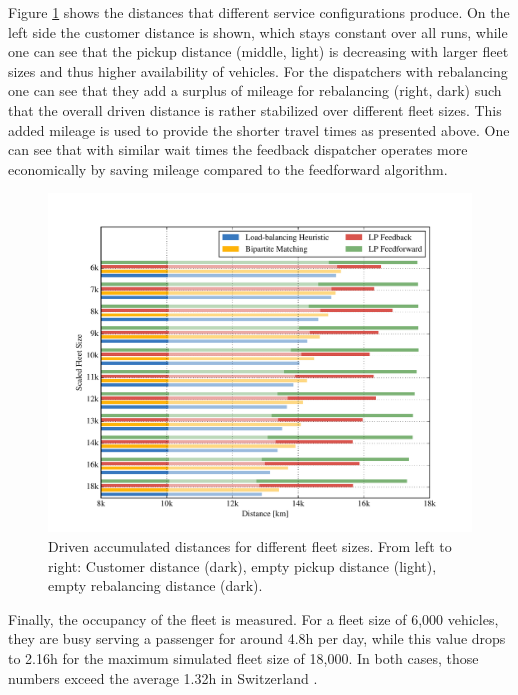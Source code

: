 
Figure \ref{fig:distances} shows the distances that different service configurations
produce. On the left side the customer distance is shown, which stays constant
over all runs, while one can see that the pickup distance (middle, light) is decreasing
with larger fleet sizes and thus higher availability of vehicles. For the dispatchers
with rebalancing one can see that they add a surplus of mileage for rebalancing (right, dark)
such that the overall driven distance is rather stabilized over different fleet sizes.
This added mileage is used to provide the shorter travel times as presented above.
One can see that with similar wait times the feedback dispatcher operates more economically
by saving mileage compared to the feedforward algorithm.

\begin{figure}
\includegraphics[width=1.0\textwidth]{figures/distances.pdf}
\caption{Driven accumulated distances for different fleet sizes. From left to right:
Customer distance (dark), empty pickup distance (light), empty rebalancing distance (dark).}
\label{fig:distances}
\end{figure}

Finally, the occupancy of the fleet is measured. For a fleet size of 6,000
vehicles, they are busy serving a passenger for around 4.8h per day, while
this value drops to 2.16h for the maximum simulated fleet size of 18,000. In both cases,
those numbers exceed the average 1.32h in Switzerland \cite{Bosch2016a}.

